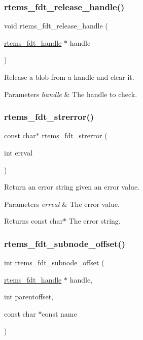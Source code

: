 \subsubsection{\texorpdfstring{rtems\_fdt\_release\_handle()}{rtems\_fdt\_release\_handle()}}
{\footnotesize\ttfamily void rtems\+\_\+fdt\+\_\+release\+\_\+handle (\begin{DoxyParamCaption}\item[{\mbox{\hyperlink{structrtems__fdt__handle}{rtems\+\_\+fdt\+\_\+handle}} $\ast$}]{handle }\end{DoxyParamCaption})}

Release a blob from a handle and clear it.


\begin{DoxyParams}{Parameters}
{\em handle} & The handle to check. \\
\hline
\end{DoxyParams}
\mbox{\label{rtems-fdt_8h_a29d5e02973f7a6950997f9df08fbcdbe}} 
\subsubsection{\texorpdfstring{rtems\_fdt\_strerror()}{rtems\_fdt\_strerror()}}
{\footnotesize\ttfamily const char$\ast$ rtems\+\_\+fdt\+\_\+strerror (\begin{DoxyParamCaption}\item[{int}]{errval }\end{DoxyParamCaption})}

Return an error string given an error value.


\begin{DoxyParams}{Parameters}
{\em errval} & The error value. \\
\hline
\end{DoxyParams}
\begin{DoxyReturn}{Returns}
const char$\ast$ The error string. 
\end{DoxyReturn}
\mbox{\label{rtems-fdt_8h_a85e2da108a4d349e480859964ad66b87}} 
\subsubsection{\texorpdfstring{rtems\_fdt\_subnode\_offset()}{rtems\_fdt\_subnode\_offset()}}
{\footnotesize\ttfamily int rtems\+\_\+fdt\+\_\+subnode\+\_\+offset (\begin{DoxyParamCaption}\item[{\mbox{\hyperlink{structrtems__fdt__handle}{rtems\+\_\+fdt\+\_\+handle}} $\ast$}]{handle,  }\item[{int}]{parentoffset,  }\item[{const char $\ast$const}]{name }\end{DoxyParamCaption})}

